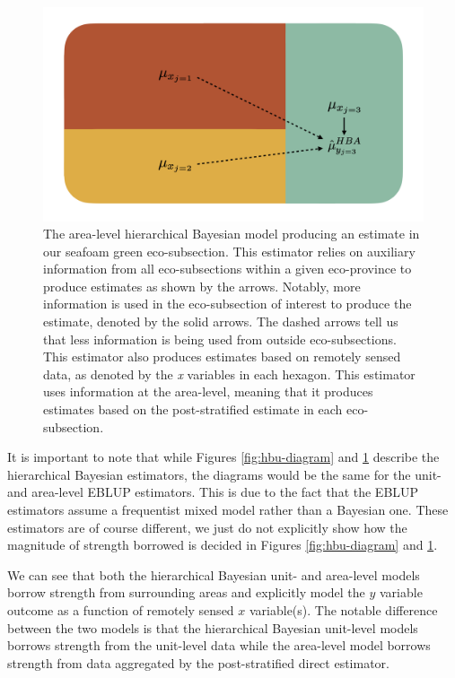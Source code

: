 \documentclass[12pt,twoside]{reedthesis}
\begin{document}
\begin{figure}

{\centering \includegraphics[width=1\linewidth]{figure/hba-diagram} 

}

\caption[The area-level hierarchical Bayesian model]{The area-level hierarchical Bayesian model producing an estimate in our seafoam green eco-subsection. This estimator relies on auxiliary information from all eco-subsections within a given eco-province to produce estimates as shown by the arrows. Notably, more information is used in the eco-subsection of interest to produce the estimate, denoted by the solid arrows. The dashed arrows tell us that less information is being used from outside eco-subsections. This estimator also produces estimates based on remotely sensed data, as denoted by the \textit{x} variables in each hexagon. This estimator uses information at the area-level, meaning that it produces estimates based on the post-stratified estimate in each eco-subsection.}\label{fig:hba-diagram}
\end{figure}
It is important to note that while Figures \ref{fig:hbu-diagram} and \ref{fig:hba-diagram} describe the hierarchical Bayesian estimators, the diagrams would be the same for the unit- and area-level EBLUP estimators. This is due to the fact that the EBLUP estimators assume a frequentist mixed model rather than a Bayesian one. These estimators are of course different, we just do not explicitly show how the magnitude of strength borrowed is decided in Figures \ref{fig:hbu-diagram} and \ref{fig:hba-diagram}.

We can see that both the hierarchical Bayesian unit- and area-level models borrow strength from surrounding areas and explicitly model the \(y\) variable outcome as a function of remotely sensed \(x\) variable(s). The notable difference between the two models is that the hierarchical Bayesian unit-level models borrows strength from the unit-level data while the area-level model borrows strength from data aggregated by the post-stratified direct estimator.
\end{document}
